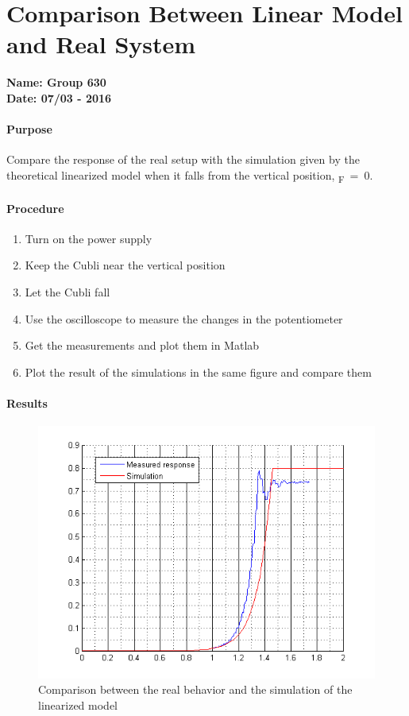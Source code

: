 \chapter{Comparison Between Linear Model and Real System}\label{comparisonLinModelReal} 
\textbf{Name: Group 630}\\
\textbf{Date: 07/03 - 2016}

\subsubsection{Purpose}
Compare the response of the real setup with the simulation given by the theoretical linearized model when it falls from the vertical position, \si{\theta_F=0}.

\subsubsection{Procedure}
\begin{enumerate}
	\item Turn on the power supply
	\item Keep the Cubli near the vertical position
	\item Let the Cubli fall
	\item Use the oscilloscope to measure the changes in the potentiometer 
	\item Get the measurements and plot them in Matlab
	\item Plot the result of the simulations in the same figure and compare them

\end{enumerate}

\subsubsection{Results}
\begin{figure}[H] 
	\centering 
	\includegraphics[scale=0.9]{figures/comparisonRealModel}
	\caption{Comparison between the real behavior and the simulation of the linearized model}
	\label{comparisonRealModel}
\end{figure} 

